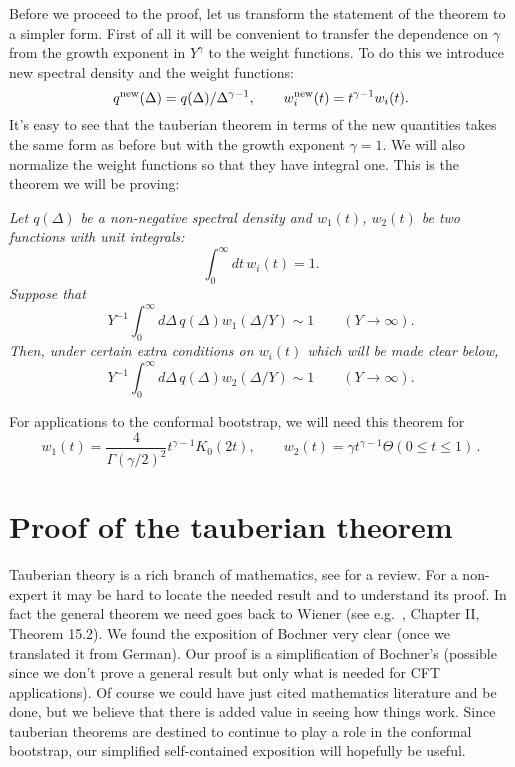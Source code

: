 \documentclass[12pt]{article}
\newcommand{\beq}{\begin{equation}}
\newcommand{\eeq}{\end{equation}}
\def\le{\leqslant}
\numberwithin{equation}{section}
\begin{document}
Before we proceed to the proof, let us transform the statement of the theorem to a simpler form. First of all it will be convenient to transfer the dependence on $\gamma$ from the growth exponent in $Y^\gamma$ to the weight functions. To do this we introduce new spectral density and the weight functions:
\beq
q^{\rm new}(\Delta) = q(\Delta)/\Delta^{\gamma-1},\qquad w_i^{\rm new}(t)= t^{\gamma-1} w_i(t).
\eeq
It's easy to see that the tauberian theorem in terms of the new quantities takes the same form as before but with the growth exponent $\gamma=1$. We will also normalize the weight functions so that they have integral one. This is the theorem we will be proving:


\vspace{0.03in}

 {\it Let $q(\Delta)$ be a non-negative spectral density and $w_1(t)$, $w_2(t)$ be two functions with unit integrals:
\beq 
\int _0^\infty dt\,w_i(t) =1.
\eeq
Suppose that 
\beq
\label{4.8}
Y^{-1}\int_0^\infty d\Delta\,q(\Delta) w_1(\Delta/Y) \sim 1 \qquad (Y\to \infty).
\eeq
Then, under certain extra conditions on $w_i(t)$ which will be made clear below,
\beq
\label{4.9}
Y^{-1}\int_0^\infty d\Delta\,q(\Delta)  w_2(\Delta/Y) \sim 1\qquad (Y\to \infty).
\eeq
}

\noindent For applications to the conformal bootstrap, we will need this theorem for
\beq
\label{willneed}
w_1(t) = \frac{4}{\Gamma(\gamma/2)^2} t^{\gamma-1} K_0(2t),\qquad w_2(t) = \gamma t^{\gamma-1} \Theta(0\le t\le1)\,.
\eeq

\section{Proof of the tauberian theorem}
\label{proof}

Tauberian theory is a rich branch of mathematics, see \cite{Korevaar} for a review. For a non-expert it may be hard to locate the needed result and to understand its proof. In fact the general theorem we need goes back to Wiener \cite{Wiener} (see e.g.~\cite{Korevaar}, Chapter II, Theorem 15.2). We found the exposition of Bochner \cite{Bochner,Bochner-collected} very clear (once we translated it from German). Our proof is a simplification of Bochner's (possible since we don't prove a general result but only what is needed for CFT applications). Of course we could have just cited mathematics literature and be done, but we believe that there is added value in seeing how things work. Since tauberian theorems are destined to continue to play a role in the conformal bootstrap, our simplified self-contained exposition will hopefully be useful.
\end{document}
